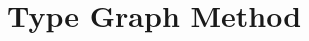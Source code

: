 \documentclass{beamer}
\newcommand{\graphbox}[8]{
  \begin{scope}[xshift=#2,yshift=#3]
    \draw [rounded corners=2mm] (0,0) rectangle (#4,-#5);
    \node at (0,0mm) [anchor=north west,inner sep=1mm] {#1};
    \begin{scope}[xshift=#4/2+#6,yshift=#7] 
    #8
    \end{scope}
  \end{scope}
}
\begin{document}

\section{Type Graph Method}
\end{document}
